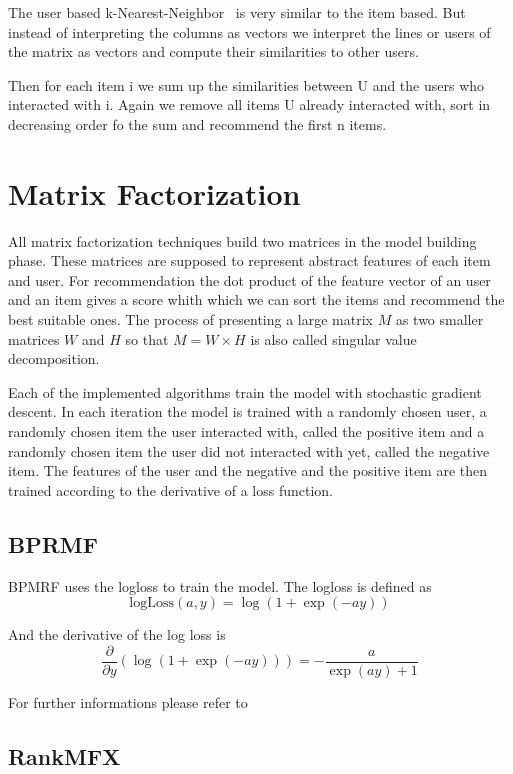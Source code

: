 The user based k-Nearest-Neighbor~\cite{userbasedknn} is very similar to the item based.
But instead of interpreting the columns as vectors we interpret the
lines or users of the matrix as vectors and compute their similarities
to other users.

Then for each item i we sum up the similarities between U and the
users who interacted with i. Again we remove all items U already interacted
with, sort in decreasing order fo the sum and recommend the first
n items.


\section{Matrix Factorization}

All matrix factorization techniques build two matrices in the model
building phase. These matrices are supposed to represent abstract
features of each item and user. For recommendation the dot product
of the feature vector of an user and an item gives a score whith which
we can sort the items and recommend the best suitable ones. The process
of presenting a large matrix \(M\) as two smaller matrices \(W\) and \(H\) so
that \(M = W \times H\) is also called singular value decomposition.

Each of the implemented algorithms train the model with stochastic
gradient descent. In each iteration the model is trained with a randomly
chosen user, a randomly chosen item the user interacted with, called
the positive item and a randomly chosen item the user did not interacted
with yet, called the negative item. The features of the user and the
negative and the positive item are then trained according to the derivative
of a loss function.


\subsection{BPRMF}

BPMRF uses the logloss to train the model. The logloss is defined
as
\[
\textrm{logLoss}(a,y)=\log(1+\exp(-ay))
\]


And the derivative of the log loss is
\[
\frac{\partial}{\partial y}(\log(1+\exp(-ay)))=-\frac{a}{\exp(ay)+1}
\]


For further informations please refer to~\cite{Rendle:2009:BBP:1795114.1795167}


\subsection{RankMFX}

